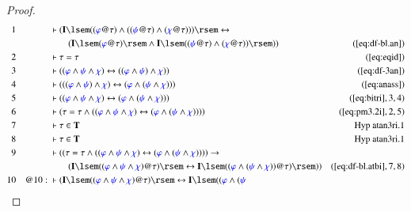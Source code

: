 \begin{proof}
\begin{align}
  1 &&  & \vdash ( \mathbf{I} \lsem ( ( \mw{\varphi} @ \tau ) \wedge ( (
      \mw{\psi} @ \tau ) \wedge ( \mw{\chi} @ \tau ) ) )
      \rsem \leftrightarrow \notag \\ & & & \qquad
       ( \mathbf{I} \lsem (
      \mw{\varphi} @ \tau ) \rsem \wedge \mathbf{I} \lsem (
      ( \mw{\psi} @ \tau ) \wedge ( \mw{\chi} @ \tau ) )
      \rsem ) )&(\mbox{\ref{eq:df-bl.an}})\notag
  \\ 2 &&  & \vdash \tau = \tau&(\mbox{\ref{eq:eqid}})\notag
  \\ 3 &&  & \vdash ( ( \mw{\varphi} \wedge \mw{\psi} \wedge \mw{\chi} )
      \leftrightarrow ( ( \mw{\varphi} \wedge \mw{\psi} )
      \wedge \mw{\chi} ) )&(\mbox{\ref{eq:df-3an}})\notag
  \\ 4 &&  & \vdash ( ( ( \mw{\varphi} \wedge \mw{\psi} ) \wedge \mw{\chi} )
      \leftrightarrow ( \mw{\varphi} \wedge ( \mw{\psi}
      \wedge \mw{\chi} ) ) )&(\mbox{\ref{eq:anass}})\notag
  \\ 5 &&  & \vdash ( ( \mw{\varphi} \wedge \mw{\psi} \wedge \mw{\chi} )
      \leftrightarrow ( \mw{\varphi} \wedge ( \mw{\psi}
      \wedge \mw{\chi} ) )
      )&(\mbox{\ref{eq:bitri}},3,4)\notag
  \\ 6 &&  & \vdash ( \tau = \tau \wedge ( ( \mw{\varphi} \wedge \mw{\psi}
      \wedge \mw{\chi} ) \leftrightarrow ( \mw{\varphi}
      \wedge ( \mw{\psi} \wedge \mw{\chi} ) ) )
      )&(\mbox{\ref{eq:pm3.2i}},2,5)\notag
  \\ 7 &&  & \vdash \tau \in \mathbf{T}&\text{Hyp~atan3ri.1}\notag%
  \\ 8 &&  & \vdash \tau \in \mathbf{T}&\text{Hyp~atan3ri.1}\notag%
  \\ 9 &&  & \vdash ( ( \tau = \tau \wedge ( ( \mw{\varphi} \wedge \mw{\psi}
      \wedge \mw{\chi} ) \leftrightarrow ( \mw{\varphi}
      \wedge ( \mw{\psi} \wedge \mw{\chi} ) ) ) )
      \rightarrow  \notag \\ & & & \qquad
      ( \mathbf{I} \lsem ( ( \mw{\varphi}
      \wedge \mw{\psi} \wedge \mw{\chi} ) @ \tau ) \rsem
      \leftrightarrow \mathbf{I} \lsem ( ( \mw{\varphi}
      \wedge ( \mw{\psi} \wedge \mw{\chi} ) ) @ \tau )
      \rsem ) )&(\mbox{\ref{eq:df-bl.atbi}},7,8)\notag
  \\ 10 && @10:\  & \vdash ( \mathbf{I} \lsem ( ( \mw{\varphi} \wedge \mw{\psi}
      \wedge \mw{\chi} ) @ \tau ) \rsem \leftrightarrow
      \mathbf{I} \lsem ( ( \mw{\varphi} \wedge ( \mw{\psi}

\end{align}
\end{proof}
